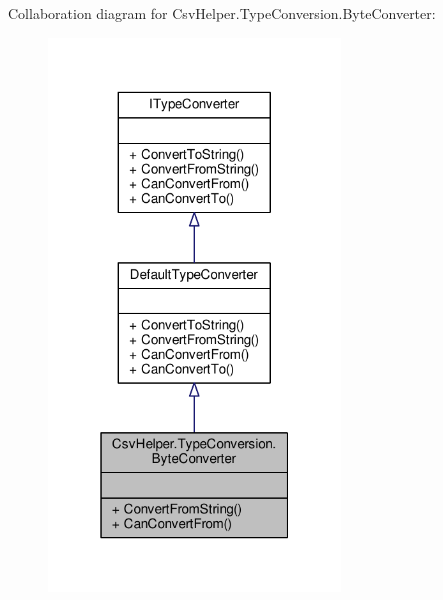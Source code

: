 Collaboration diagram for Csv\-Helper.\-Type\-Conversion.\-Byte\-Converter\-:
\nopagebreak
\begin{figure}[H]
\begin{center}
\leavevmode
\includegraphics[width=220pt]{d6/d66/a00441}
\end{center}
\end{figure}
